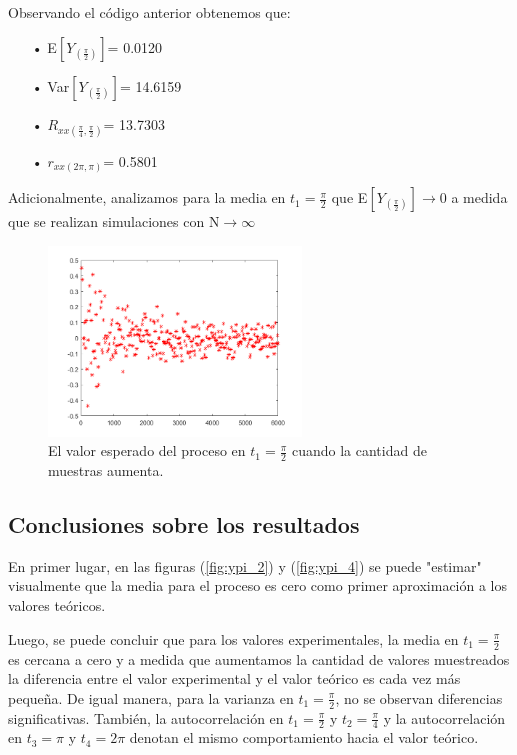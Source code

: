 Observando el código anterior obtenemos que:
\begin{enumerate}
	\item[•]E$\left[ Y_{(\frac{\pi}{2})}\right]$= 0.0120 
	\item[•]Var$\left[Y_{(\frac{\pi}{2})}\right]$= 14.6159
	\item[•]$R_{xx(\frac{\pi}{4},\frac{\pi}{2})}$= 13.7303
	\item[•]$r_{xx(2\pi,\pi)}$= 0.5801
\end{enumerate}

Adicionalmente, analizamos para la media en $t_1 = \frac{\pi}{2}$ que E$\left[ Y_{(\frac{\pi}{2})}\right]\rightarrow 0$ a medida que se realizan simulaciones con N$\rightarrow \infty$
\begin{figure}[H]
\centering
	\includegraphics[width=0.6\textwidth, trim = {0 0 0 0},clip]{./ImagenesEjercicio1/media.png}
	\caption{El valor esperado del proceso en $t_1 = \frac{\pi}{2}$ cuando la cantidad de muestras aumenta.}
	\label{fig:media}
\end{figure}

\subsection{Conclusiones sobre los resultados}

En primer lugar, en las figuras (\ref{fig:ypi_2}) y (\ref{fig:ypi_4}) se puede "estimar" visualmente que la media para el proceso es cero como primer aproximación a los valores teóricos.

Luego, se puede concluir que para los valores experimentales, la media en $t_1 = \frac{\pi}{2}$ es cercana a cero y a medida que aumentamos la cantidad de valores muestreados la diferencia entre el valor experimental y el valor teórico es cada vez más pequeña. De igual manera, para la varianza en $t_1 = \frac{\pi}{2}$, no se observan diferencias significativas.
También, la autocorrelación en $t_1 = \frac{\pi}{2}$ y $t_2 = \frac{\pi}{4}$ y la autocorrelación en $t_3 = \pi$ y $t_4 = 2\pi$ denotan el mismo comportamiento hacia el valor teórico. 

